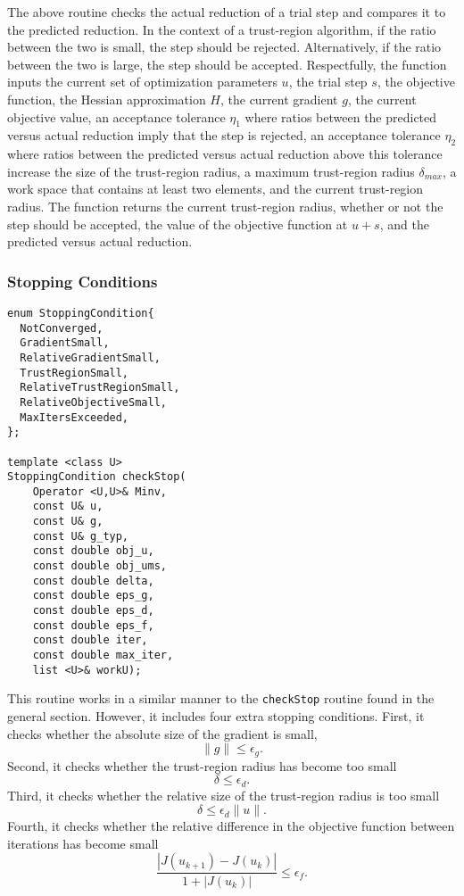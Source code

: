 \documentclass{article}
\begin{document}
The above routine checks the actual reduction of a trial step and compares it to the predicted reduction.  In the context of a trust-region algorithm, if the ratio between the two is small, the step should be rejected.  Alternatively, if the ratio between the two is large, the step should be accepted.  Respectfully, the function inputs the current set of optimization parameters $u$, the trial step $s$, the objective function, the Hessian approximation $H$, the current gradient $g$, the current objective value, an acceptance tolerance $\eta_1$ where ratios between the predicted versus actual reduction imply that the step is rejected, an acceptance tolerance $\eta_2$ where ratios between the predicted versus actual reduction above this tolerance increase the size of the trust-region radius, a maximum trust-region radius $\delta_{max}$, a work space that contains at least two elements, and the current trust-region radius.  The function returns the current trust-region radius, whether or not the step should be accepted, the value of the objective function at $u+s$, and the predicted versus actual reduction.

\subsubsection{Stopping Conditions}

\begin{flushleft}
\begin{lstlisting}
enum StoppingCondition{
  NotConverged,               
  GradientSmall,             
  RelativeGradientSmall,    
  TrustRegionSmall,         
  RelativeTrustRegionSmall, 
  RelativeObjectiveSmall,   
  MaxItersExceeded,        
};

template <class U>
StoppingCondition checkStop(
    Operator <U,U>& Minv,
    const U& u,
    const U& g,
    const U& g_typ,
    const double obj_u,
    const double obj_ums,
    const double delta,
    const double eps_g,
    const double eps_d,
    const double eps_f,
    const double iter,
    const double max_iter,
    list <U>& workU);
\end{lstlisting}
\end{flushleft}

    This routine works in a similar manner to the \texttt{checkStop} routine found in the general section.  However, it includes four extra stopping conditions.  First, it checks whether the absolute size of the gradient is small,
$$
	\|g\|\leq \epsilon_g.
$$
Second, it checks whether the trust-region radius has become too small
$$
	\delta\leq \epsilon_d.
$$
Third, it checks whether the relative size of the trust-region radius is too small
$$
	\delta\leq\epsilon_d\|u\|.
$$
Fourth, it checks whether the relative difference in the objective function between iterations has become small
$$
	\frac{|J(u_{k+1})-J(u_k)|}{1+|J(u_k)|}\leq\epsilon_f.
$$
\end{document}
